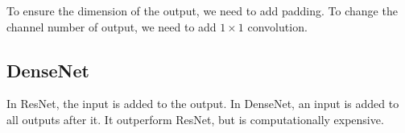 To ensure the dimension of the output, we need to add padding. To change the channel number of output, we need to add $1\times 1$ convolution. 

\subsection{DenseNet}

In ResNet, the input is added to the output. In DenseNet, an input is added to all outputs after it. It outperform ResNet, but is computationally expensive.


































